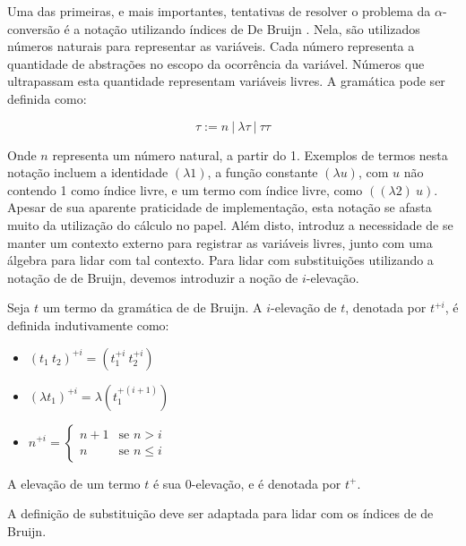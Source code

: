 Uma das primeiras, e mais importantes, tentativas de resolver o problema da
$\alpha$-conversão é a notação utilizando índices de De Bruijn \cite{debruijn72}. Nela, são
utilizados números naturais para representar as variáveis. Cada número
representa a quantidade de abstrações no escopo da ocorrência da variável.
Números que ultrapassam esta quantidade representam variáveis livres. A
gramática pode ser definida como:

\[ \tau := n\ |\ \lambda \tau\ |\ \tau \tau \]

Onde $n$ representa um número natural, a partir do 1. Exemplos de termos
nesta notação incluem a identidade $(\lambda 1)$, a função constante $(\lambda
u)$, com $u$ não contendo 1 como índice livre, e um termo com índice
livre, como $((\lambda 2)\ u)$. Apesar de sua aparente praticidade de
implementação, esta notação se afasta muito da utilização do cálculo no papel.
Além disto, introduz a necessidade de se manter um contexto externo para
registrar as variáveis livres, junto com uma álgebra para lidar com tal
contexto. Para lidar com substituições utilizando a notação de de Bruijn,
devemos introduzir a noção de $i$-elevação.

\begin{definicao} Seja $t$ um termo da gramática de de Bruijn. A
    $i$-elevação de $t$, denotada por $t^{+i}$, é definida indutivamente como:
    \begin{itemize}
        \item $(t_1\ t_2)^{+i} = (t_1^{+i}\ t_2^{+i})$
        \item $(\lambda t_1)^{+i} = \lambda (t_1^{+(i+1)})$
        \item $n^{+i} = \begin{cases}
                            n + 1   & \text{se } n > i \\
                            n       & \text{se } n \leq i
                        \end{cases}$
    \end{itemize}
    A elevação de um termo $t$ é sua $0$-elevação, e é denotada por $t^+$.
    
\end{definicao}

A definição de substituição deve ser adaptada para lidar com os índices de de
Bruijn.

